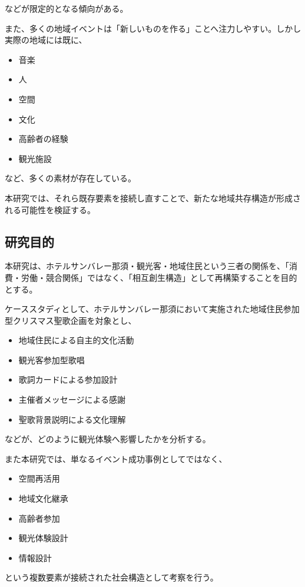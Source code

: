 などが限定的となる傾向がある。

また、多くの地域イベントは「新しいものを作る」ことへ注力しやすい。しかし実際の地域には既に、

\begin{itemize}
\item 音楽
\item 人
\item 空間
\item 文化
\item 高齢者の経験
\item 観光施設
\end{itemize}

など、多くの素材が存在している。

本研究では、それら既存要素を接続し直すことで、新たな地域共存構造が形成される可能性を検証する。


\subsection{研究目的}

本研究は、ホテルサンバレー那須・観光客・地域住民という三者の関係を、「消費・労働・競合関係」ではなく、「相互創生構造」として再構築することを目的とする。

ケーススタディとして、ホテルサンバレー那須において実施された地域住民参加型クリスマス聖歌企画を対象とし、

\begin{itemize}
\item 地域住民による自主的文化活動
\item 観光客参加型歌唱
\item 歌詞カードによる参加設計
\item 主催者メッセージによる感謝
\item 聖歌背景説明による文化理解
\end{itemize}

などが、どのように観光体験へ影響したかを分析する。

また本研究では、単なるイベント成功事例としてではなく、

\begin{itemize}
\item 空間再活用
\item 地域文化継承
\item 高齢者参加
\item 観光体験設計
\item 情報設計
\end{itemize}

という複数要素が接続された社会構造として考察を行う。
